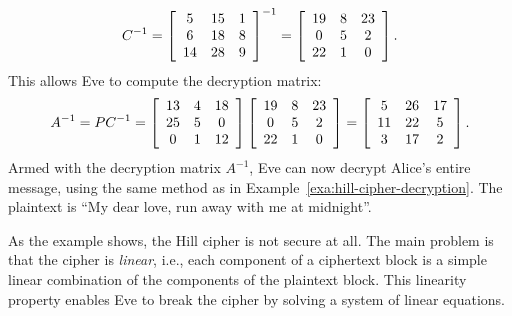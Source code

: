 \documentclass{ximera}
\begin{document}
\begin{solution}
  \begin{equation*}
    C^{-1}
    =
    \startmat{ccc}
      5 & 15 & 1 \\
      6 & 18 & 8 \\
      14 & 28 & 9 \\
    \stopmat^{-1}
    =
    \startmat{ccc}
      19 & 8 & 23 \\
      0 & 5 & 2 \\
      22 & 1 & 0 \\
    \stopmat.
  \end{equation*}
  This allows Eve to compute the decryption matrix:
  \begin{equation*}
    A^{-1}
    =
    PC^{-1}
    =
    \startmat{ccc}
      13 & 4 & 18 \\
      25 & 5 & 0 \\
      0 & 1 & 12 \\
    \stopmat
    \startmat{ccc}
      19 & 8 & 23 \\
      0 & 5 & 2 \\
      22 & 1 & 0 \\
    \stopmat
    =
    \startmat{ccc}
      5  & 26 & 17 \\
      11 & 22 & 5 \\
      3  & 17 & 2 \\
    \stopmat.
  \end{equation*}
  Armed with the decryption matrix $A^{-1}$, Eve can now decrypt
  Alice's entire message, using the same method as in
  Example~\ref{exa:hill-cipher-decryption}. The plaintext is ``My dear
  love, run away with me at midnight''.
\end{solution}

As the example shows, the Hill cipher is not secure at all. The main
problem is that the cipher is {\em linear}, i.e., each component of a
ciphertext block is a simple linear combination of the components of
the plaintext block. This linearity property enables Eve to break the
cipher by solving a system of linear equations.
\end{document}
